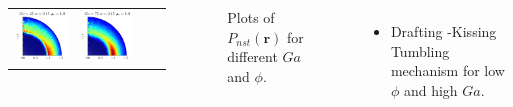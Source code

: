\documentclass{sintefbeamer}
\begin{document}
\begin{frame}
\begin{columns}
\begin{tabular}{cccc}
        \includegraphics[height=0.3\textwidth]{image/HOMOGENEOUS/fDrop/Pnst_mu_r_1_0_Ga_25_PHI_0_15.pdf}&
        \includegraphics[height=0.3\textwidth]{image/HOMOGENEOUS/fDrop/Pnst_mu_r_1_0_Ga_75_PHI_0_15.pdf}\\
      \end{tabular}

      \begin{figure}
        \caption{Plots of $P_{nst} (\textbf{r})$ for different $Ga$ and $\phi$.}
      \end{figure}
    
    \begin{itemize}
      \item Drafting -Kissing Tumbling mechanism for low $\phi$ and high $Ga$. 
    \end{itemize}
  \end{columns}
\end{frame}
\end{document}
